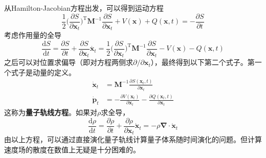         从Hamilton-Jacobian方程出发，可以得到运动方程
        \begin{equation*}
            \frac 12 \bigg(\frac {\partial S}{\partial \bm{x}_t}\bigg)^{\mathrm{T}} \bm{M}^{-1} \frac {\partial S}{\partial \bm{x}_t} + V(\bm{x}) + Q(\bm{x}, t) = -\frac {\partial S}{\partial t}
        \end{equation*}
        考虑作用量的全导
        \begin{equation*}
            \frac {\mathrm{d}S}{\mathrm{d}t} = \frac {\partial S}{\partial t} + \frac {\partial S}{\partial \bm{x}_t} \dot{\bm{x}_t} = \frac 12 \bigg(\frac {\partial S}{\partial \bm{x}_t}\bigg)^{\mathrm{T}} \bm{M}^{-1} \frac {\partial S}{\partial \bm{x}_t} - V(\bm{x}) - Q(\bm{x}, t)
        \end{equation*}
        之后可以对位置求偏导（即对方程两侧求${\partial} / {\partial \bm{x}_t}$），最终得到以下第二个式子。第一个式子是动量的定义。
        \begin{align*}
            \dot{\bm{x}}_t &= \bm{M}^{-1} \frac {\partial S(\bm{x}_t,t)}{\partial \bm{x}_t} \\
            \dot{\bm{p}}_t &= -\frac {\partial V(\bm{x}_t)}{\partial \bm{x}_t} - \frac {\partial Q(\bm{x}_t, t)}{\partial \bm{x}_t}
        \end{align*}
        这称为\textbf{量子轨线方程}。如果对$\rho$求全导，
        \begin{equation*}
            \frac {\mathrm{d}\rho}{\mathrm{d}t} = \frac {\partial \rho}{\partial t} + \frac {\partial \rho}{\partial \bm{x}_t} \dot{\bm{x}}_t = -\rho \bm{\nabla} \cdot \dot{\bm{x}}_t
        \end{equation*}
        由以上方程，可以通过直接演化量子轨线计算量子体系随时间演化的问题。但计算速度场的散度在数值上无疑是十分困难的。
        
        